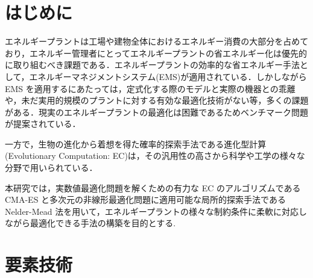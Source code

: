 \documentclass[twocolumn]{jarticle}
\begin{document}

\section{はじめに}
エネルギープラントは工場や建物全体におけるエネルギー消費の大部分を占めており，エネルギー管理者にとってエネルギープラントの省エネルギー化は優先的に取り組むべき課題である．エネルギープラントの効率的な省エネルギー手法として，エネルギーマネジメントシステム(EMS)が適用されている．しかしながら EMS を適用するにあたっては，定式化する際のモデルと実際の機器との乖離や，未だ実用的規模のプラントに対する有効な最適化技術がない等，多くの課題がある．現実のエネルギープラントの最適化は困難であるためベンチマーク問題が提案されている．

一方で，生物の進化から着想を得た確率的探索手法である進化型計算(Evolutionary Computation: EC)は，その汎用性の高さから科学や工学の様々な分野で用いられている．

本研究では，実数値最適化問題を解くための有力な EC のアルゴリズムである CMA-ES と多次元の非線形最適化問題に適用可能な局所的探索手法である Nelder-Mead 法を用いて，エネルギープラントの様々な制約条件に柔軟に対応しながら最適化できる手法の構築を目的とする.


\section{要素技術}
\end{document}

